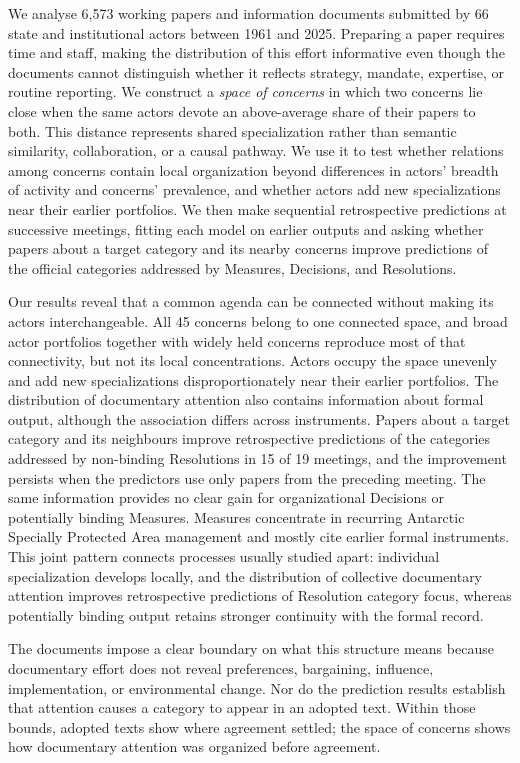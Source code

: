 \documentclass{fun_article}
\begin{document}
We analyse 6,573 working papers and information documents submitted by 66 state and institutional actors between 1961 and 2025. Preparing a paper requires time and staff, making the distribution of this effort informative even though the documents cannot distinguish whether it reflects strategy, mandate, expertise, or routine reporting. We construct a \emph{space of concerns} in which two concerns lie close when the same actors devote an above-average share of their papers to both. This distance represents shared specialization rather than semantic similarity, collaboration, or a causal pathway. We use it to test whether relations among concerns contain local organization beyond differences in actors' breadth of activity and concerns' prevalence, and whether actors add new specializations near their earlier portfolios. We then make sequential retrospective predictions at successive meetings, fitting each model on earlier outputs and asking whether papers about a target category and its nearby concerns improve predictions of the official categories addressed by Measures, Decisions, and Resolutions.

Our results reveal that a common agenda can be connected without making its actors interchangeable. All 45 concerns belong to one connected space, and broad actor portfolios together with widely held concerns reproduce most of that connectivity, but not its local concentrations. Actors occupy the space unevenly and add new specializations disproportionately near their earlier portfolios. The distribution of documentary attention also contains information about formal output, although the association differs across instruments. Papers about a target category and its neighbours improve retrospective predictions of the categories addressed by non-binding Resolutions in 15 of 19 meetings, and the improvement persists when the predictors use only papers from the preceding meeting. The same information provides no clear gain for organizational Decisions or potentially binding Measures. Measures concentrate in recurring Antarctic Specially Protected Area management and mostly cite earlier formal instruments. This joint pattern connects processes usually studied apart: individual specialization develops locally, and the distribution of collective documentary attention improves retrospective predictions of Resolution category focus, whereas potentially binding output retains stronger continuity with the formal record.

The documents impose a clear boundary on what this structure means because documentary effort does not reveal preferences, bargaining, influence, implementation, or environmental change. Nor do the prediction results establish that attention causes a category to appear in an adopted text. Within those bounds, adopted texts show where agreement settled; the space of concerns shows how documentary attention was organized before agreement.
\end{document}
